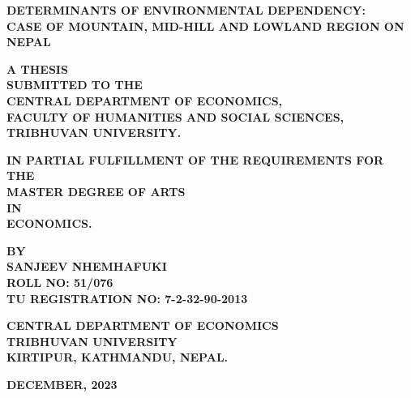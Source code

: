 \documentclass[12pt]{report}
\begin{document}
\begin{titlepage}
    \begin{center}
        \vspace*{1cm}
        
        \textbf{\large DETERMINANTS OF ENVIRONMENTAL DEPENDENCY: \\ CASE OF MOUNTAIN, MID-HILL AND LOWLAND REGION ON NEPAL}
        
        \vspace{1.5cm}
        
        \textbf{ A THESIS} \\
        
        \textbf{SUBMITTED TO THE \\
        CENTRAL DEPARTMENT OF ECONOMICS, \\
        FACULTY OF HUMANITIES AND SOCIAL SCIENCES, \\
        TRIBHUVAN UNIVERSITY.}
        
        \vspace{1.5cm}
        
        \textbf{IN PARTIAL FULFILLMENT OF THE REQUIREMENTS FOR THE \\
        MASTER DEGREE OF ARTS \\
        IN \\
        ECONOMICS.}
        
        \vspace{1.5cm}
        
        \textbf{BY \\
        SANJEEV NHEMHAFUKI \\
        ROLL NO: 51/076 \\
        TU REGISTRATION NO: 7-2-32-90-2013}
        
        \vspace{1.5cm}
        
        \textbf{CENTRAL DEPARTMENT OF ECONOMICS \\
        TRIBHUVAN UNIVERSITY \\
        KIRTIPUR, KATHMANDU, NEPAL.}
        
        \vspace{1.5cm}
        
        \textbf{DECEMBER, 2023}
        
    \end{center}
\end{titlepage}
\end{document}
